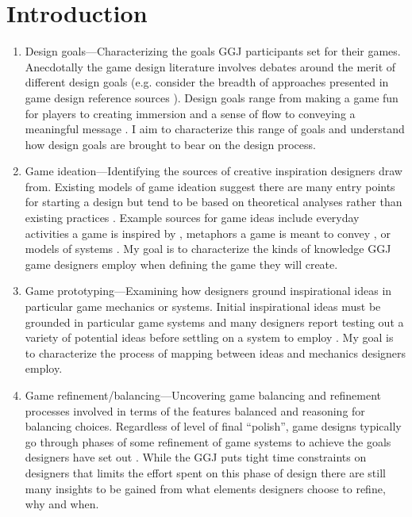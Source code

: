\documentclass{sig-alternate}
\begin{document}
\section{Introduction}

\begin{enumerate}
\item Design goals---Characterizing the goals GGJ participants set for their games. Anecdotally the game design literature involves debates around the merit of different design goals (e.g. consider the breadth of approaches presented in game design reference sources \cite{fullerton2008:playcentric}\cite{salen2003:rulesplay} \cite{salen2006:reader} \cite{schell2008:gamedesign}). Design goals range from making a game fun for players \cite{koster2005:theory-fun} to creating immersion and a sense of flow \cite{fullerton2006:cloudgame} to conveying a meaningful message \cite{bogost2007:persuasive}. I aim to characterize this range of goals and understand how design goals are brought to bear on the design process.
\item Game ideation---Identifying the sources of creative inspiration designers draw from. Existing models of game ideation suggest there are many entry points for starting a design but tend to be based on theoretical analyses rather than existing practices \cite{hunicke2004:mda}. Example sources for game ideas include everyday activities a game is inspired by \cite{treanor2010:kaboom}, metaphors a game is meant to convey \cite{rusch2008:game-metaphor}, or models of systems \cite{crawford1984:gamedesign}. My goal is to characterize the kinds of knowledge GGJ game designers employ when defining the game they will create.
\item Game prototyping---Examining how designers ground inspirational ideas in particular game mechanics or systems. Initial inspirational ideas must be grounded in particular game systems and many designers report testing out a variety of potential ideas before settling on a system to employ \cite{gabler2005:7day-prototype} \cite{manker2011:prototyping} \cite{nelson2009:reqanal}. My goal is to characterize the process of mapping between ideas and mechanics designers employ.
\item Game refinement/balancing---Uncovering game balancing and refinement processes involved in terms of the features balanced and reasoning for balancing choices. Regardless of level of final ``polish'', game designs typically go through phases of some refinement of game systems to achieve the goals designers have set out \cite{schell2008:gamedesign}. While the GGJ puts tight time constraints on designers that limits the effort spent on this phase of design there are still many insights to be gained from what elements designers choose to refine, why and when.
\end{enumerate}
\end{document}
